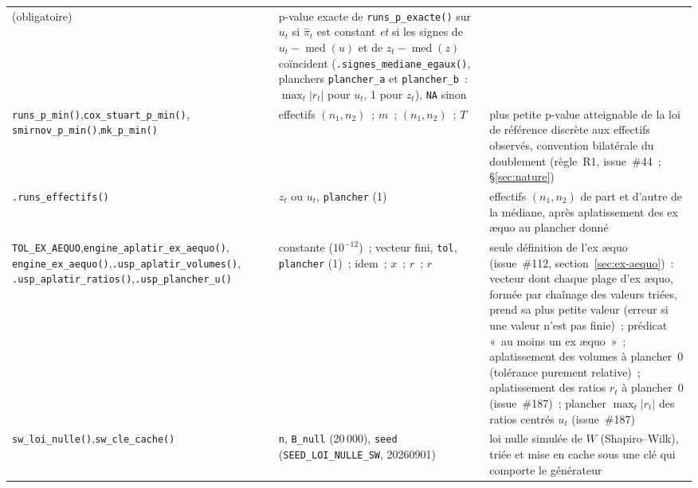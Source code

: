 \documentclass[a4paper,11pt]{article}
\newcommand{\code}[1]{\texttt{\small #1}}
\begin{document}
{\begin{longtable}{@{}p{4.6cm}p{4.0cm}p{6.2cm}@{}}
(obligatoire) &
p-value exacte de \code{runs\_p\_exacte()} sur $u_t$ si $\hat\pi_t$ est constant
\emph{et} si les signes de $u_t - \operatorname{med}(u)$ et de $z_t -
\operatorname{med}(z)$ coïncident (\code{.signes\_mediane\_egaux()}, planchers
\code{plancher\_a} et \code{plancher\_b}~: $\max_t|r_t|$ pour $u_t$, 1 pour $z_t$), \code{NA}
sinon \\
\code{runs\_p\_min()},\newline \code{cox\_stuart\_p\_min()},\newline
\code{smirnov\_p\_min()},\newline \code{mk\_p\_min()} & effectifs $(n_1, n_2)$~; $m$~;
$(n_1, n_2)$~; $T$ & plus petite p-value atteignable de la loi de référence discrète aux effectifs
observés, convention bilatérale du doublement (règle~R1, issue~\#44~; §\ref{sec:nature}) \\
\code{.runs\_effectifs()} & $z_t$ ou $u_t$, \code{plancher} (1) & effectifs $(n_1, n_2)$ de part et d'autre de la
médiane, après aplatissement des ex \ae quo au plancher donné \\
\code{TOL\_EX\_AEQUO},\newline \code{engine\_aplatir\_}\newline\code{ex\_aequo()},\newline
\code{engine\_ex\_aequo()},\newline \code{.usp\_aplatir\_}\newline\code{volumes()},\newline
\code{.usp\_aplatir\_}\newline\code{ratios()},\newline \code{.usp\_plancher\_u()} & constante
($10^{-12}$)~; vecteur fini, \code{tol}, \code{plancher} (1)~; idem~; $x$~; $r$~; $r$ & seule définition de l'ex
\ae quo (issue~\#112, section~\ref{sec:ex-aequo})~: vecteur dont chaque plage d'ex \ae quo, formée
par chaînage des valeurs triées, prend sa plus petite valeur (erreur si une valeur n'est pas
finie)~; prédicat «~au moins un ex \ae quo~»~; aplatissement des volumes à plancher~0 (tolérance
purement relative)~; aplatissement des ratios $r_t$ à plancher~0 (issue~\#187)~; plancher
$\max_t|r_t|$ des ratios centrés $u_t$ (issue~\#187) \\
\code{sw\_loi\_nulle()},\newline \code{sw\_cle\_cache()} & \code{n}, \code{B\_null}
(20\,000), \code{seed} (\code{SEED\_LOI\_NULLE\_SW}, 20260901) & loi nulle simulée de $W$
(Shapiro--Wilk), triée et mise en cache sous une clé qui comporte le générateur \\

\end{longtable}}
\end{document}
